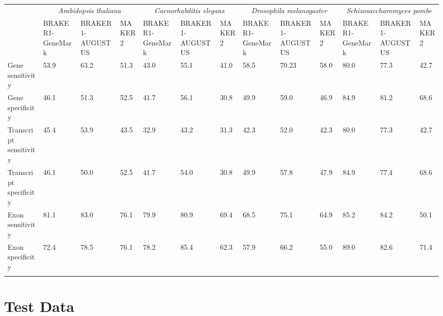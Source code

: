 \documentclass{bioinfo}
\begin{document}
\begin{methods}
\begin{table}[!t]
{\begin{tabular}{lp{.9cm}p{.9cm}p{.9cm}p{.9cm}p{.9cm}p{.9cm}p{.9cm}p{.9cm}p{.9cm}p{.9cm}p{.9cm}p{.9cm}}\toprule
 & \multicolumn{3}{c}{\textit{Arabidopsis thaliana}} &  \multicolumn{3}{c}{\textit{Caenorhabditis elegans}} &  \multicolumn{3}{c}{\textit{Drosophila melanogaster}} &  \multicolumn{3}{c}{\textit{Schizosaccharomyces pombe}}\\
 & \tiny{BRAKER1-GeneMark} & \tiny{BRAKER1-AUGUSTUS} & \tiny{MAKER2} & \tiny{BRAKER1-GeneMark} & \tiny{BRAKER1-AUGUSTUS} & \tiny{MAKER2} & \tiny{BRAKER1-GeneMark} & \tiny{BRAKER1-AUGUSTUS} & \tiny{MAKER2} & \tiny{BRAKER1-GeneMark} &\tiny{BRAKER1-AUGUSTUS} & \tiny{MAKER2}\\
 \midrule
Gene sensitivity & 53.9 & 63.2 & 51.3 & 43.0 & 55.1& 41.0 & 58.5& 70.23 & 58.0 & 80.0& 77.3  & 42.7\\
Gene specificity & 46.1 & 51.3 & 52.5& 41.7& 56.1& 30.8& 49.9 & 59.0 & 46.9& 84.9& 81.2& 68.6\\
Transcript sensitivity & 45.4 & 53.9 & 43.5& 32.9& 43.2& 31.3& 42.3 &52.0 & 42.3 & 80.0& 77.3& 42.7\\
Transcript specificity & 46.1 & 50.0 & 52.5& 41.7 & 54.0& 30.8 & 49.9 & 57.8 & 47.9 &84.9 & 77.4 & 68.6\\
Exon sensitivity & 81.1 & 83.0 & 76.1& 79.9& 80.9& 69.4 & 68.5& 75.1& 64.9& 85.2 & 84.2 & 50.1 \\
Exon specificity & 72.4 & 78.5 & 76.1& 78.2& 85.4& 62.3 & 57.9 & 66.2 & 55.0 & 89.0& 82.6& 71.4\\
\botrule

\end{tabular}}{}
\end{table}

\section{Test Data}


\end{methods}
\end{document}
